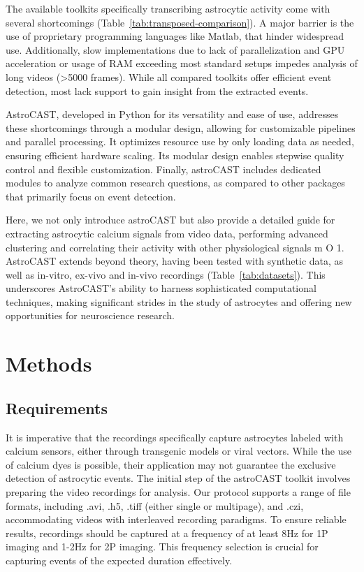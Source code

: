 \documentclass[utf8]{FrontiersinHarvard}
\newcommand{\fref}{ m O{} }{ (Figure~\ref{fig:#1}\IfValueT{#2}{\,#2})}
\newcommand{\tref}[1]{ (Table~\ref{tab:#1})}
\begin{document}
    The available toolkits specifically transcribing astrocytic activity come with several shortcomings\tref{transposed-comparison}. A major barrier is the use of proprietary programming languages like Matlab, that hinder widespread use. Additionally, slow implementations due to lack of parallelization and \ac{GPU} acceleration or usage of RAM exceeding most standard setups impedes analysis of long videos (>5000 frames). While all compared toolkits offer efficient event detection, most lack support to gain insight from the extracted events.

    AstroCAST, developed in Python for its versatility and ease of use, addresses these shortcomings through a modular design, allowing for customizable pipelines and parallel processing. It optimizes resource use by only loading data as needed, ensuring efficient hardware scaling. Its modular design enables stepwise quality control and flexible customization. Finally, astroCAST includes dedicated modules to analyze common research questions, as compared to other packages that primarily focus on event detection.

    Here, we not only introduce astroCAST but also provide a detailed guide for extracting astrocytic calcium signals from video data, performing advanced clustering and correlating their activity with other physiological signals\fref{1}. AstroCAST extends beyond theory, having been tested with synthetic data, as well as in-vitro, ex-vivo and in-vivo recordings\tref{datasets}. This underscores AstroCAST’s ability to harness sophisticated computational techniques, making significant strides in the study of astrocytes and offering new opportunities for neuroscience research.


    \section{Methods}

    \subsection{Requirements}
    It is imperative that the recordings specifically capture astrocytes labeled with calcium sensors, either through transgenic models or viral vectors. While the use of calcium dyes is possible, their application may not guarantee the exclusive detection of astrocytic events. The initial step of the astroCAST toolkit involves preparing the video recordings for analysis. Our protocol supports a range of file formats, including .avi, .h5, .tiff (either single or multipage), and .czi, accommodating videos with interleaved recording paradigms. To ensure reliable results, recordings should be captured at a frequency of at least 8Hz for \ac{1P} imaging and 1-2Hz for \ac{2P} imaging. This frequency selection is crucial for capturing events of the expected duration effectively.
\end{document}
